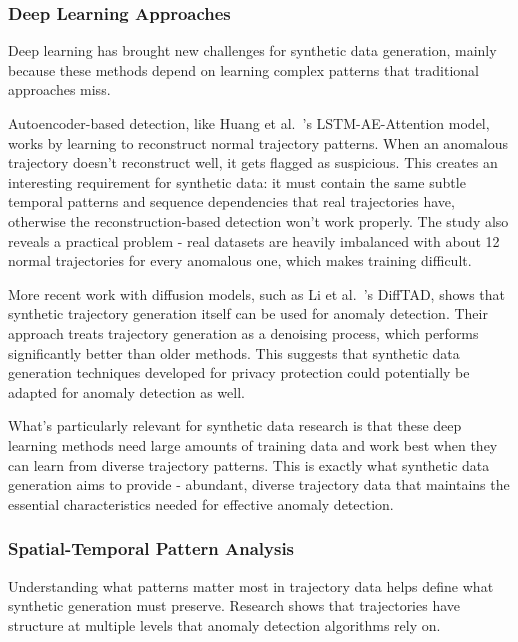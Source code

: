 \documentclass[runningheads]{llncs}
\begin{document}
\subsubsection{Deep Learning Approaches}
\label{sec:deep-learning}

Deep learning has brought new challenges for synthetic data generation, mainly because these methods depend on learning complex patterns that traditional approaches miss.

Autoencoder-based detection, like Huang et al.~\cite{huang2021lstm}'s LSTM-AE-Attention model, works by learning to reconstruct normal trajectory patterns. When an anomalous trajectory doesn't reconstruct well, it gets flagged as suspicious. This creates an interesting requirement for synthetic data: it must contain the same subtle temporal patterns and sequence dependencies that real trajectories have, otherwise the reconstruction-based detection won't work properly. The study also reveals a practical problem - real datasets are heavily imbalanced with about 12 normal trajectories for every anomalous one, which makes training difficult.

More recent work with diffusion models, such as Li et al.~\cite{li2023diffusion}'s DiffTAD, shows that synthetic trajectory generation itself can be used for anomaly detection. Their approach treats trajectory generation as a denoising process, which performs significantly better than older methods. This suggests that synthetic data generation techniques developed for privacy protection could potentially be adapted for anomaly detection as well.

What's particularly relevant for synthetic data research is that these deep learning methods need large amounts of training data and work best when they can learn from diverse trajectory patterns. This is exactly what synthetic data generation aims to provide - abundant, diverse trajectory data that maintains the essential characteristics needed for effective anomaly detection.

\subsubsection{Spatial-Temporal Pattern Analysis}
\label{sec:spatial-temporal}

Understanding what patterns matter most in trajectory data helps define what synthetic generation must preserve. Research shows that trajectories have structure at multiple levels that anomaly detection algorithms rely on.
\end{document}
